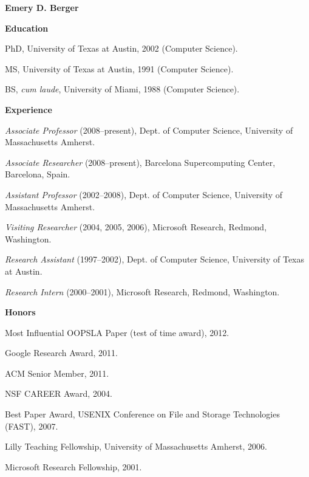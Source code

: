 \documentclass[11pt]{article}
\begin{document}
\begin{center}
{\bf\textsf{Emery D. Berger}} \\[1ex]
\end{center}

\begin{description}
\setlength{\labelsep}{0ex}
\setlength{\itemsep}{-0.5ex}

\item {\bf\textsf{Education}} 


\item PhD, University of Texas at Austin, 2002 (Computer Science).
\item MS,  University of Texas at Austin, 1991 (Computer Science).
\item BS, \emph{cum laude}, University of Miami, 1988 (Computer
  Science).  

\end{description}

\begin{description}
\setlength{\labelsep}{0ex}
\setlength{\itemsep}{-0.5ex}

\item {\bf\textsf {Experience}} 

\item {\em Associate Professor} (2008--present), Dept. of Computer Science,
University of Massachusetts Amherst.
\item {\em Associate Researcher} (2008--present), Barcelona Supercomputing Center, Barcelona, Spain.
\item {\em Assistant Professor} (2002--2008), Dept. of Computer Science,
University of Massachusetts Amherst.
\item {\em Visiting Researcher} (2004, 2005, 2006), Microsoft Research, Redmond, Washington.
\item {\em Research Assistant} (1997--2002), Dept. of Computer Science, University of Texas at Austin.
\item {\em Research Intern} (2000--2001), Microsoft Research, Redmond, Washington.
\end{description}


\begin{description}
\setlength{\labelsep}{0ex}
\setlength{\itemsep}{-0.5ex}

\item {\bf\textsf {Honors}}
\item Most Influential OOPSLA Paper (test of time award), 2012.
\item Google Research Award, 2011.
\item ACM Senior Member, 2011.
\item NSF CAREER Award, 2004.
\item Best Paper Award, USENIX Conference on File and Storage Technologies (FAST), 2007.
\item Lilly Teaching Fellowship, University of Massachusetts Amherst, 2006.
\item Microsoft Research Fellowship, 2001.
\end{description}
\end{document}
